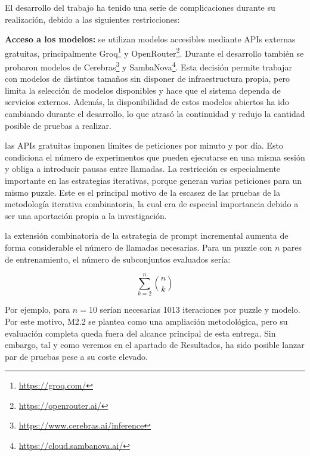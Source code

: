 El desarrollo del trabajo ha tenido una serie de complicaciones durante su realización, debido a las siguientes restricciones:

\begin{description}
	
	\item \textbf{Acceso a los modelos:} se utilizan modelos accesibles mediante APIs externas gratuitas, principalmente Groq\footnote{\url{https://groq.com/}} y OpenRouter\footnote{\url{https://openrouter.ai/}}. Durante el desarrollo también se probaron modelos de Cerebras\footnote{\url{https://www.cerebras.ai/inference}} y SambaNova\footnote{\url{https://cloud.sambanova.ai/}}. Esta decisión permite trabajar con modelos de distintos tamaños sin disponer de infraestructura propia, pero limita la selección de modelos disponibles y hace que el sistema dependa de servicios externos. Además, la disponibilidad de estos modelos abiertos ha ido cambiando durante el desarrollo, lo que atrasó la continuidad y redujo la cantidad posible de pruebas a realizar.
	
	\item[Límites de tasa:] las APIs gratuitas imponen límites de peticiones por minuto y por día. Esto condiciona el número de experimentos que pueden ejecutarse en una misma sesión y obliga a introducir pausas entre llamadas. La restricción es especialmente importante en las estrategias iterativas, porque generan varias peticiones para un mismo puzzle. Este es el principal motivo de la escasez de las pruebas de la metodología iterativa combinatoria, la cual era de especial importancia debido a ser una aportación propia a la investigación.
	
	\item[Coste combinatorio de la metodología iterativa combinatoria acumulativa (M2.2):] la extensión combinatoria de la estrategia de prompt incremental aumenta de forma considerable el número de llamadas necesarias. Para un puzzle con $n$ pares de entrenamiento, el número de subconjuntos evaluados sería:
	
	\[
	\sum_{k=2}^{n} \binom{n}{k}
	\]
	
	Por ejemplo, para $n=10$ serían necesarias 1013 iteraciones por puzzle y modelo. Por este motivo, M2.2 se plantea como una ampliación metodológica, pero su evaluación completa queda fuera del alcance principal de esta entrega. Sin embargo, tal y como veremos en el apartado de Resultados, ha sido posible lanzar par de pruebas pese a su coste elevado.
	

\end{description}

